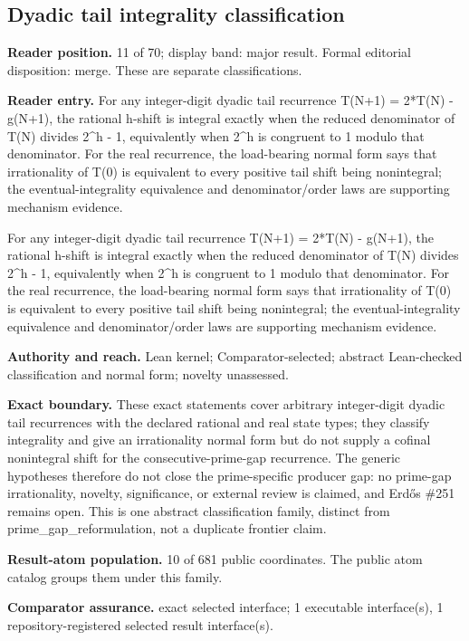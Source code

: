 \documentclass[11pt]{article}
\begin{document}
\subsection{Dyadic tail integrality classification}
\textbf{Reader position.} 11 of 70; display band: major result.  Formal editorial disposition: merge.  These are separate classifications.

\textbf{Reader entry.} For any integer-digit dyadic tail recurrence T(N+1) = 2*T(N) - g(N+1), the rational h-shift is integral exactly when the reduced denominator of T(N) divides 2\textasciicircum{}h - 1, equivalently when 2\textasciicircum{}h is congruent to 1 modulo that denominator. For the real recurrence, the load-bearing normal form says that irrationality of T(0) is equivalent to every positive tail shift being nonintegral; the eventual-integrality equivalence and denominator/order laws are supporting mechanism evidence.

For any integer-digit dyadic tail recurrence T(N+1) = 2*T(N) - g(N+1), the rational h-shift is integral exactly when the reduced denominator of T(N) divides 2\textasciicircum{}h - 1, equivalently when 2\textasciicircum{}h is congruent to 1 modulo that denominator. For the real recurrence, the load-bearing normal form says that irrationality of T(0) is equivalent to every positive tail shift being nonintegral; the eventual-integrality equivalence and denominator/order laws are supporting mechanism evidence.

\textbf{Authority and reach.} Lean kernel; Comparator-selected; abstract Lean-checked classification and normal form; novelty unassessed.

\textbf{Exact boundary.} These exact statements cover arbitrary integer-digit dyadic tail recurrences with the declared rational and real state types; they classify integrality and give an irrationality normal form but do not supply a cofinal nonintegral shift for the consecutive-prime-gap recurrence. The generic hypotheses therefore do not close the prime-specific producer gap: no prime-gap irrationality, novelty, significance, or external review is claimed, and Erdős \#251 remains open. This is one abstract classification family, distinct from prime\_gap\_reformulation, not a duplicate frontier claim.

\textbf{Result-atom population.} 10 of 681 public coordinates. The public atom catalog groups them under this family.

\textbf{Comparator assurance.} exact selected interface; 1 executable interface(s), 1 repository-registered selected result interface(s).
\end{document}
